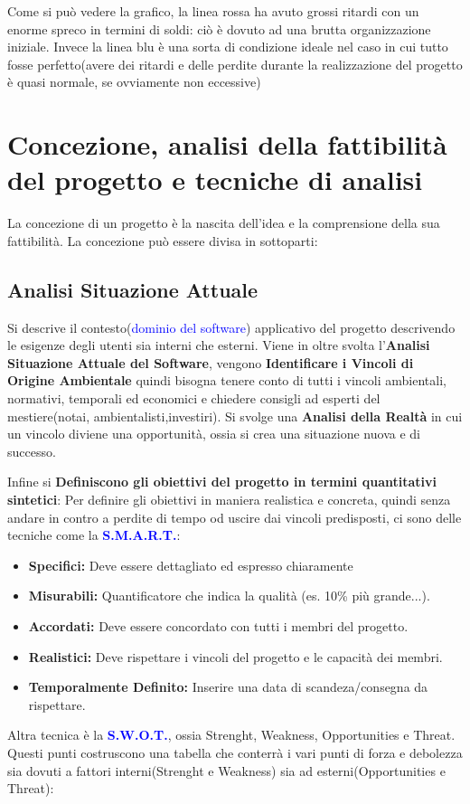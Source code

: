 \documentclass{article}
\begin{document}
Come si può vedere la grafico, la linea rossa ha avuto grossi ritardi con un enorme spreco in termini di soldi: ciò è dovuto ad una brutta organizzazione iniziale.
Invece la linea blu è una sorta di condizione ideale nel caso in cui tutto fosse perfetto(avere dei ritardi e delle perdite durante la realizzazione del progetto è quasi normale, se ovviamente non eccessive)

\section{Concezione, analisi della fattibilità del progetto e tecniche di analisi}
La concezione di un progetto è la nascita dell'idea e la comprensione della sua fattibilità.
La concezione può essere divisa in sottoparti:

\subsection{Analisi Situazione Attuale}
Si descrive il contesto(\textcolor{blue}{dominio del software}) applicativo del progetto descrivendo le esigenze degli utenti sia interni che esterni.
Viene in oltre svolta l'\textbf{Analisi Situazione Attuale del Software}, vengono \textbf{Identificare i Vincoli di Origine Ambientale} quindi bisogna tenere conto di tutti i vincoli ambientali, normativi, temporali ed economici e chiedere consigli ad esperti del mestiere(notai, ambientalisti,investiri).
Si svolge una \textbf{Analisi della Realtà} in cui un vincolo diviene una opportunità, ossia si crea una situazione nuova e di successo.

Infine si \textbf{Definiscono gli obiettivi del progetto in termini quantitativi sintetici}:
Per definire gli obiettivi in maniera realistica e concreta, quindi senza andare in contro a perdite di tempo od uscire dai vincoli predisposti, ci sono delle tecniche come
la \textbf{\textcolor{blue}{S.M.A.R.T.}}:
\begin{itemize}
	\item \textbf{Specifici:} Deve essere dettagliato ed espresso chiaramente
	\item \textbf{Misurabili:} Quantificatore che indica la qualità (es. 10\% più grande...).
	\item \textbf{Accordati:} Deve essere concordato con tutti i membri del progetto.
	\item \textbf{Realistici:} Deve rispettare i vincoli del progetto e le 										capacità dei membri.
	\item \textbf{Temporalmente Definito:} Inserire una data di scandeza/consegna da rispettare.
\end{itemize}
Altra tecnica è la \textbf{\textcolor{blue}{S.W.O.T.}}, ossia Strenght, Weakness, Opportunities e Threat.
Questi punti costruscono una tabella che conterrà i vari punti di forza e debolezza sia dovuti a fattori interni(Strenght e Weakness) sia ad esterni(Opportunities e Threat):
\end{document}
